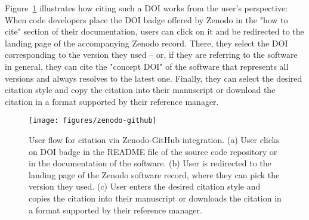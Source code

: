 \documentclass[9pt,review,pubversion]{livecoms}
\begin{document}
Figure~\ref{fig:zenodo-github} illustrates how citing such a DOI works from the user's perspective:
When code developers place the DOI badge offered by Zenodo in the "how to cite" section of their documentation, users can click on it and be redirected to the landing page of the accompanying Zenodo record.
There, they select the DOI corresponding to the version they used -- or, if they are referring to the software in general, they can cite the "concept DOI" of the software that represents all versions and always resolves to the latest one.
Finally, they can select the desired citation style and copy the citation into their manuscript or download the citation in a format supported by their reference manager.

\begin{figure}
    \texttt{[image: figures/zenodo-github]}
    \caption{
        User flow for citation via Zenodo-GitHub integration.
        (a) User clicks on DOI badge in the README file of the source code repository or in the documentation of the software.
        (b) User is redirected to the landing page of the Zenodo software record, where they can pick the version they used.
        (c) User enters the desired citation style and copies the citation \cite{Sun2020c} into their manuscript or downloads the citation in a format supported by their reference manager.
    }
    \label{fig:zenodo-github}
\end{figure}


%  
%  
%  

\end{document}
